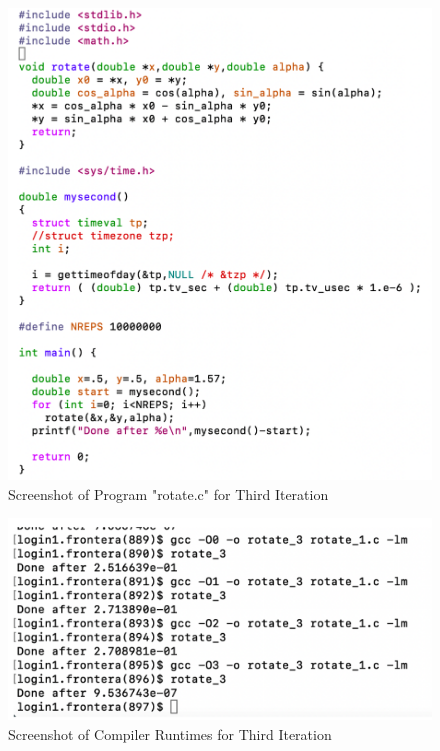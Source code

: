 \documentclass{article}
\begin{document}

\begin{figure}[ht]
    \centering
\includegraphics[scale=0.20]{graphics_hw4/rotate_c_third_iteration.png}
    \caption{Screenshot of Program "rotate.c" for Third Iteration}
    \label{fig:my_label}
\end{figure}
\pagebreak


\begin{figure}[!h]
    \centering
\includegraphics[scale=0.20]{graphics_hw4/compilation_runtimes_third_iteration.png}
    \caption{Screenshot of Compiler Runtimes for Third Iteration}
    \label{fig:my_label}
\end{figure}
\pagebreak
\end{document}

